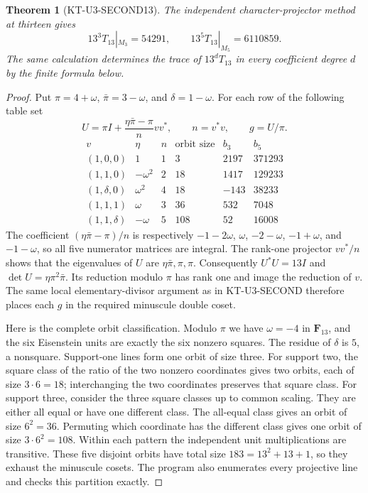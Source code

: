 \documentclass[11pt,a4paper]{article}
\newtheorem{theorem}{Theorem}[section]
\theoremstyle{definition}
\begin{document}
\begin{theorem}[KT-U3-SECOND13]
The independent character-projector method at thirteen gives
\[
          13^3T_{13}|_{M_3}=54291,
          \qquad 13^5T_{13}|_{M_5}=6110859.
\]
The same calculation determines the trace of $13^dT_{13}$ in every
coefficient degree $d$ by the finite formula below.
\end{theorem}
\begin{proof}
Put $\pi=4+\omega$, $\bar\pi=3-\omega$, and $\delta=1-\omega$.
For each row of the following table set
\[
      U=\pi I+\frac{\eta\bar\pi-\pi}{n}vv^*,
      \qquad n=v^*v,\qquad g=U/\pi.
\]
\[
\begin{array}{c|c|r|r|r|r}
v&\eta&n&\text{orbit size}&b_3&b_5\\\hline
(1,0,0)&1&1&3&2197&371293\\
(1,1,0)&-\omega^2&2&18&1417&129233\\
(1,\delta,0)&\omega^2&4&18&-143&38233\\
(1,1,1)&\omega&3&36&532&7048\\
(1,1,\delta)&-\omega&5&108&52&16008
\end{array}
\]
The coefficient $(\eta\bar\pi-\pi)/n$ is respectively
$-1-2\omega$, $\omega$, $-2-\omega$, $-1+\omega$, and
$-1-\omega$, so all five numerator matrices are integral.
The rank-one projector $vv^*/n$ shows that the eigenvalues of
$U$ are $\eta\bar\pi,\pi,\pi$. Consequently
$U^*U=13I$ and $\det U=\eta\pi^2\bar\pi$.
Its reduction modulo $\pi$ has rank one and image the reduction
of $v$. The same local elementary-divisor argument as in
KT-U3-SECOND therefore places each $g$ in the required minuscule
double coset.

Here is the complete orbit classification. Modulo $\pi$ we have
$\omega=-4$ in $\mathbf F_{13}$, and the six Eisenstein units
are exactly the six nonzero squares. The residue of $\delta$ is
$5$, a nonsquare. Support-one lines form one orbit of size three.
For support two, the square class of the ratio of the two nonzero
coordinates gives two orbits, each of size $3\cdot6=18$;
interchanging the two coordinates preserves that square class.
For support three, consider the three square classes up to common
scaling. They are either all equal or have one different class.
The all-equal class gives an orbit of size $6^2=36$.
Permuting which coordinate has the different class gives one orbit
of size $3\cdot6^2=108$. Within each pattern the independent unit
multiplications are transitive. These five disjoint orbits have
total size $183=13^2+13+1$, so they exhaust the minuscule cosets.
The program also enumerates every projective line and checks this
partition exactly.


\end{proof}
\end{document}
